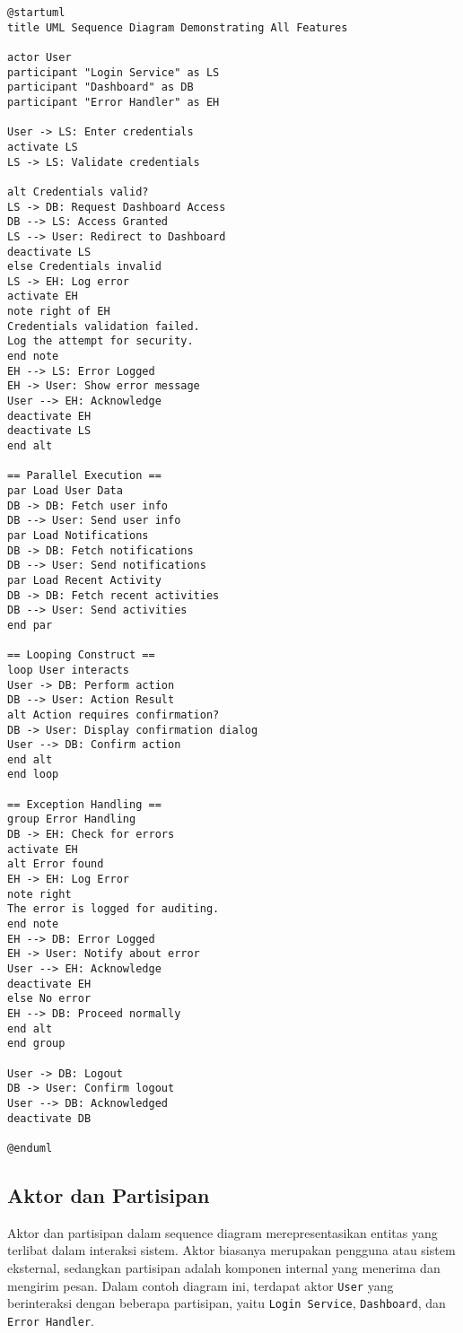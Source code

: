 \begin{lstlisting}[language=puml, caption=PlantUML code for the sequence diagram.]
@startuml
title UML Sequence Diagram Demonstrating All Features

actor User
participant "Login Service" as LS
participant "Dashboard" as DB
participant "Error Handler" as EH

User -> LS: Enter credentials
activate LS
LS -> LS: Validate credentials

alt Credentials valid?
LS -> DB: Request Dashboard Access
DB --> LS: Access Granted
LS --> User: Redirect to Dashboard
deactivate LS
else Credentials invalid
LS -> EH: Log error
activate EH
note right of EH
Credentials validation failed.
Log the attempt for security.
end note
EH --> LS: Error Logged
EH -> User: Show error message
User --> EH: Acknowledge
deactivate EH
deactivate LS
end alt

== Parallel Execution ==
par Load User Data
DB -> DB: Fetch user info
DB --> User: Send user info
par Load Notifications
DB -> DB: Fetch notifications
DB --> User: Send notifications
par Load Recent Activity
DB -> DB: Fetch recent activities
DB --> User: Send activities
end par

== Looping Construct ==
loop User interacts
User -> DB: Perform action
DB --> User: Action Result
alt Action requires confirmation?
DB -> User: Display confirmation dialog
User --> DB: Confirm action
end alt
end loop

== Exception Handling ==
group Error Handling
DB -> EH: Check for errors
activate EH
alt Error found
EH -> EH: Log Error
note right
The error is logged for auditing.
end note
EH --> DB: Error Logged
EH -> User: Notify about error
User --> EH: Acknowledge
deactivate EH
else No error
EH --> DB: Proceed normally
end alt
end group

User -> DB: Logout
DB -> User: Confirm logout
User --> DB: Acknowledged
deactivate DB

@enduml
\end{lstlisting}

\subsection{Aktor dan Partisipan}
Aktor dan partisipan dalam sequence diagram merepresentasikan entitas yang terlibat dalam interaksi sistem. Aktor biasanya merupakan pengguna atau sistem eksternal, sedangkan partisipan adalah komponen internal yang menerima dan mengirim pesan. Dalam contoh diagram ini, terdapat aktor \texttt{User} yang berinteraksi dengan beberapa partisipan, yaitu \texttt{Login Service}, \texttt{Dashboard}, dan \texttt{Error Handler}.


